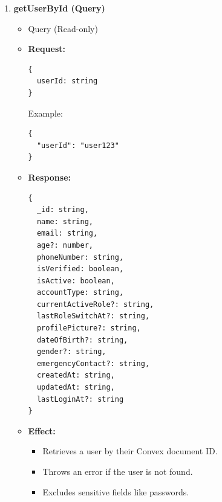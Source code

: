 \documentclass[a4paper,12pt]{article}
\begin{document}
\begin{enumerate}

  \item \textbf{getUserById (Query)}
    \begin{itemize}
      \item Query (Read-only)
      \item \textbf{Request:}
      \begin{verbatim}
{
  userId: string
}
      \end{verbatim}
      Example:
      \begin{verbatim}
{
  "userId": "user123"
}
      \end{verbatim}
      \item \textbf{Response:}
      \begin{verbatim}
{
  _id: string,
  name: string,
  email: string,
  age?: number,
  phoneNumber: string,
  isVerified: boolean,
  isActive: boolean,
  accountType: string,
  currentActiveRole?: string,
  lastRoleSwitchAt?: string,
  profilePicture?: string,
  dateOfBirth?: string,
  gender?: string,
  emergencyContact?: string,
  createdAt: string,
  updatedAt: string,
  lastLoginAt?: string
}
      \end{verbatim}
      \item \textbf{Effect:}
      \begin{itemize}
        \item Retrieves a user by their Convex document ID.
        \item Throws an error if the user is not found.
        \item Excludes sensitive fields like passwords.
      \end{itemize}
    \end{itemize}


\end{enumerate}
\end{document}
